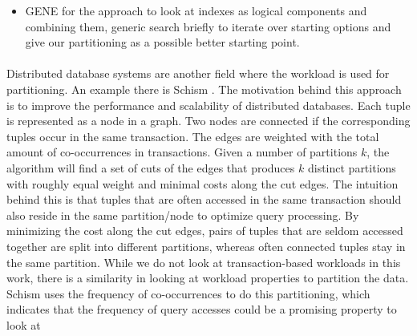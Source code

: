     \begin{itemize}
    \item GENE \cite{Dittrich2021} for the approach to look at indexes as logical components and combining them, generic
    search briefly to iterate over starting options and give our partitioning as a possible better starting point.
    \end{itemize}

\paragraph{}
Distributed database systems are another field where the workload is used for partitioning. An example there is Schism \cite{Curino2010}. The motivation behind this approach is to improve the performance and scalability of distributed databases. Each tuple is represented as a node in a graph. Two nodes are connected if the corresponding tuples occur in the same transaction. The edges are weighted with the total amount of co-occurrences in transactions. Given a number of partitions $k$, the algorithm will ﬁnd a set of cuts of the edges that produces $k$ distinct partitions with roughly equal weight and minimal costs along the cut edges. The intuition behind this is that tuples that are often accessed in the same transaction should also reside in the same partition/node to optimize query processing. By minimizing the cost along the cut edges, pairs of tuples that are seldom accessed together are split into diﬀerent partitions, whereas often connected tuples stay in the same partition. While we do not look at transaction-based workloads in this work, there is a similarity in looking at workload properties to partition the data. Schism uses the frequency of co-occurrences to do this partitioning, which indicates that the frequency of query accesses could be a promising property to look at